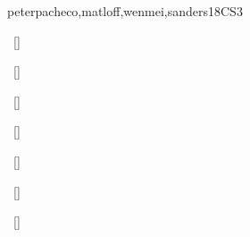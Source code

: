 \begin{syllabus}
\begin{unit}{\PDParallelPerformance}{}{peterpacheco,matloff,wenmei,sanders}{18}{CS3}
\begin{topics}%
    \item \PDParallelPerformanceTopicLoad
    \item \PDParallelPerformanceTopicPerformance
    \item \PDParallelPerformanceTopicScheduling
    \item \PDParallelPerformanceTopicEvaluating
    \item \PDParallelPerformanceTopicData
    \item \PDParallelPerformanceTopicPower
\end{topics}
\begin{learningoutcomes}%
    \item \PDParallelPerformanceLODetect~[\Usage] %
    \item \PDParallelPerformanceLOCalculateThe~[\Usage] %
    \item \PDParallelPerformanceLODescribeHowLayout~[\Familiarity] %
    \item \PDParallelPerformanceLODetectAnd~[\Usage] %
    \item \PDParallelPerformanceLOExplainTheScheduling~[\Familiarity] %
    \item \PDParallelPerformanceLOExplainPerformance~[\Familiarity] %
    \item \PDParallelPerformanceLOExplainTheTrade~[\Familiarity] %
\end{learningoutcomes}%
\end{unit}

\begin{coursebibliography}
\end{coursebibliography}

\end{syllabus}
